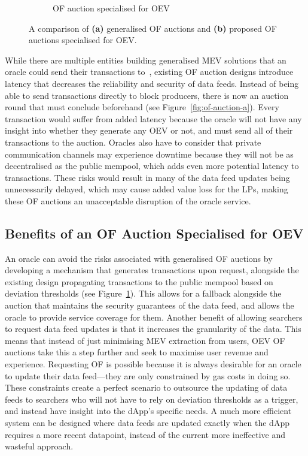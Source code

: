 \documentclass[11pt]{article}
\begin{document}
\begin{figure}
\begin{subfigure}{0.49\textwidth}
		\caption{OF auction specialised for OEV}
		\label{fig:of-auction-b}
	\end{subfigure}
	\caption{A comparison of \textbf{(a)} generalised OF auctions and \textbf{(b)} proposed OF auctions specialised for OEV.}
	\label{fig:of-auction}
\end{figure}

While there are multiple entities building generalised MEV solutions that an oracle could send their transactions to~\cite{flashbots-suave,rook}, existing OF auction designs introduce latency that decreases the reliability and security of data feeds.
Instead of being able to send transactions directly to block producers, there is now an auction round that must conclude beforehand (see Figure~\ref{fig:of-auction-a}).
Every transaction would suffer from added latency because the oracle will not have any insight into whether they generate any OEV or not, and must send all of their transactions to the auction.
Oracles also have to consider that private communication channels may experience downtime because they will not be as decentralised as the public mempool, which adds even more potential latency to transactions.
These risks would result in many of the data feed updates being unnecessarily delayed, which may cause added value loss for the LPs, making these OF auctions an unacceptable disruption of the oracle service.

\subsection{Benefits of an OF Auction Specialised for OEV}

An oracle can avoid the risks associated with generalised OF auctions by developing a mechanism that generates transactions upon request, alongside the existing design propagating transactions to the public mempool based on deviation thresholds  (see Figure~\ref{fig:of-auction-b}).
This allows for a fallback alongside the auction that maintains the security guarantees of the data feed, and allows the oracle to provide service coverage for them.
Another benefit of allowing searchers to request data feed updates is that it increases the granularity of the data. This means that instead of just minimising MEV extraction from users, OEV OF auctions take this a step further and seek to maximise user revenue and experience.
Requesting OF is possible because it is always desirable for an oracle to update their data feed—they are only constrained by gas costs in doing so.
These constraints create a perfect scenario to outsource the updating of data feeds to searchers who will not have to rely on deviation thresholds as a trigger, and instead have insight into the dApp's specific needs.
A much more efficient system can be designed where data feeds are updated exactly when the dApp requires a more recent datapoint, instead of the current more ineffective and wasteful approach.
\end{document}
